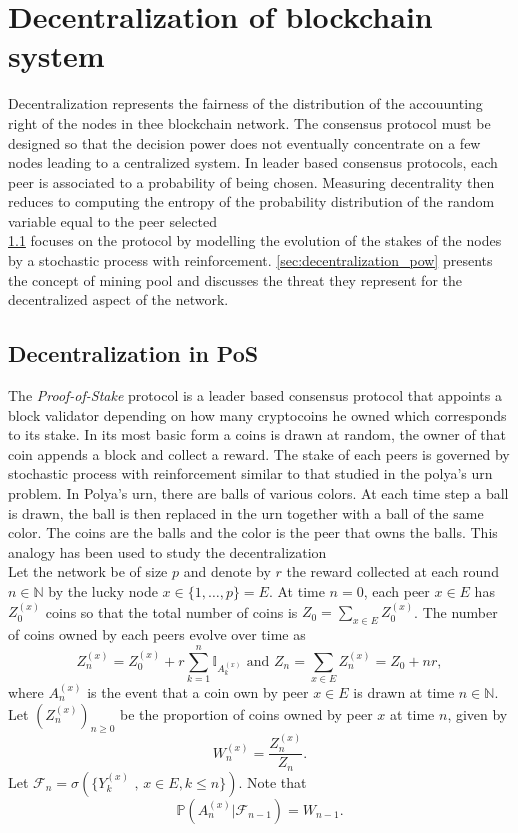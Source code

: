 \chapter{Decentralization of blockchain system}\label{chap:decentralization}
Decentralization represents the fairness of the distribution of the accouunting right of the nodes in thee blockchain network. The consensus protocol must be designed so that the decision power does not eventually concentrate on a few nodes leading to a centralized system. In leader based consensus protocols, each peer is associated to a probability of being chosen. Measuring decentrality then reduces to computing the entropy of the probability distribution of the random variable equal to the peer selected  \\

\noindent \cref{sec:decentralization_pos} focuses on the \PoS protocol by modelling the evolution of the stakes of the nodes by a stochastic process with reinforcement. \cref{sec:decentralization_pow} presents the concept of mining pool and discusses the threat they represent for the decentralized aspect of the network.

\section{Decentralization in PoS}\label{sec:decentralization_pos}
The \textit{Proof-of-Stake} protocol is a leader based consensus protocol that appoints a block validator depending on how many cryptocoins he owned which corresponds to its stake. In its most basic form a coins is drawn at random, the owner of that coin appends a block and collect a reward. The stake of each peers is governed by stochastic process with reinforcement similar to that studied in the polya's urn problem. In Polya's urn, there are balls of various colors. At each time step a ball is drawn, the ball is then replaced in the urn together with a ball of the same color. The coins are the balls and the color is the peer that owns the balls. This analogy has been used to study the decentralization\\

\noindent Let the network be of size $p$ and denote by $r$ the reward collected at each round $n\in\mathbb{N}$ by the lucky node $x\in \{1, \ldots, p\} = E$. At time $n=0$, each peer $x\in E$ has $Z^{(x)}_0$ coins so that the total number of coins is $Z_0 = \sum_{x\in E}Z^{(x)}_0$. The number of coins owned by each peers evolve over time as
$$
Z^{(x)}_n = Z^{(x)}_0 + r\sum_{k = 1}^n\mathbb{I}_{A_{k}^{(x)}}\text{ and }Z_n = \sum_{x\in E}Z^{(x)}_n = Z_0 + nr,    
$$
where $A_{n}^{(x)}$ is the event that a coin own by peer $x\in E$ is drawn at time $n\in\mathbb{N}$. Let $(Z_n^{(x)})_{n\geq0}$ be the proportion of coins owned by peer $x$ at time $n$, given by 
$$
W_n^{(x)} = \frac{Z^{(x)}_n}{Z_n}. 
$$
Let $\mathcal{F}_n = \sigma(\{Y_k^{(x)}\text{ , }x\in E, k\leq n\})$. Note that 
$$
\mathbb{P}\left(A_{n}^{(x)}|\mathcal{F}_{n-1}\right) = W_{n-1}.
$$
